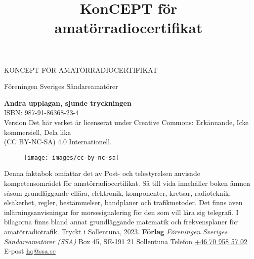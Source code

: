 \onecolumn{}
\vspace{10em}
\title{KonCEPT för amatörradiocertifikat}
\begin{center}
\Large{KONCEPT FÖR AMATÖRRADIOCERTIFIKAT}

Föreningen Sveriges Sändareamatörer\\[2\baselineskip]
\end{center}
\noindent \textbf{Andra upplagan, sjunde tryckningen}\\
\noindent ISBN: 987-91-86368-23-4\\
\noindent Version \revision
\bigskip
\noindent Det här verket är licenserat under Creative Commons:\newline
\noindent Erkännande, Icke kommersiell, Dela lika\\
\noindent (CC BY-NC-SA) 4.0 Internationell.
\begin{figure}[h]
    \texttt{[image: images/cc-by-nc-sa]}
\end{figure}
%
\vfill
%
\noindent Denna faktabok omfattar det av Post- och tele\-styrel\-sen anvisade
kompetensområdet för amatörradiocertifikat.
\bigskip
\noindent Så till vida innehåller boken ämnen såsom grundläggande ellära,
elektronik, komponenter, kretsar, radioteknik, elsäkerhet, regler, bestämmelser,
bandplaner och tra\-fik\-metoder.
Det finns även inlärningsanvisningar för morsesignalering för den som vill lära
sig telegrafi.
\bigskip
\noindent I bilagorna finns bland annat grundläggande matematik
och frekvensplaner för ama\-törradiotrafik.
%
\vfill
%
\noindent Tryckt i Sollentuna, 2023.
\bigskip
\noindent \textbf{Förlag}
\smallskip
\noindent\textit{Föreningen Sveriges Sändareamatörer (SSA)}
\smallskip\noindent Box 45, SE-191 21 Sollentuna
\smallskip
\noindent Telefon \href{tel:+46709585702}{+46 70 958 57 02}
\smallskip\noindent E-post \href{mailto:hq@ssa.se}{hq@ssa.se}
\restoregeometry\twocolumn
{}
